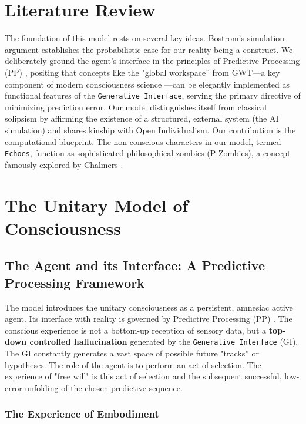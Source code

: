 \documentclass[12pt, a4paper]{article}
\begin{document}
\section{Literature Review}

The foundation of this model rests on several key ideas. Bostrom’s simulation argument \cite{Bostrom2003} establishes the probabilistic case for our reality being a construct. We deliberately ground the agent's interface in the principles of Predictive Processing (PP) \cite{Friston2010}, positing that concepts like the "global workspace” from GWT—a key component of modern consciousness science \cite{Butlin2023}—can be elegantly implemented as functional features of the \texttt{Generative Interface}, serving the primary directive of minimizing prediction error. Our model distinguishes itself from classical solipsism by affirming the existence of a structured, external system (the AI simulation) and shares kinship with Open Individualism. Our contribution is the computational blueprint. The non-conscious characters in our model, termed \texttt{Echoes}, function as sophisticated philosophical zombies (P-Zombies), a concept famously explored by Chalmers \cite{Chalmers1996}.

\section{The Unitary Model of Consciousness}

\subsection{The Agent and its Interface: A Predictive Processing Framework}

The model introduces the unitary consciousness as a persistent, amnesiac active agent. Its interface with reality is governed by Predictive Processing (PP) \cite{Friston2010}. The conscious experience is not a bottom-up reception of sensory data, but a \textbf{top-down controlled hallucination} generated by the \texttt{Generative Interface} (GI). The GI constantly generates a vast space of possible future "tracks” or hypotheses. The role of the agent is to perform an act of selection. The experience of "free will" is this act of selection and the subsequent successful, low-error unfolding of the chosen predictive sequence.

\subsubsection{The Experience of Embodiment}
\end{document}
